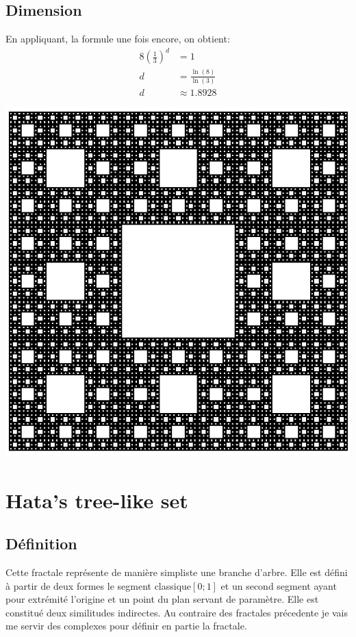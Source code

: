 \documentclass[a4paper, 12pt]{report}
\begin{document}
			\subsection{Dimension}
				En appliquant, la formule une fois encore, on obtient:
				\begin{align*}
					 8\left(\frac{1}{3}\right)^d	&=1\\
												d	&=\frac{\ln(8)}{\ln(3)}\\
												d	&\approx 1.8928
				\end{align*}
				\begin{center}
					\includegraphics[scale=0.3]{Images/carpet}
				\end{center}
		\newpage
		\section{Hata's tree-like set}
			\subsection{Définition}
			Cette fractale représente de manière simpliste une branche d'arbre. Elle est défini à partir de deux formes le segment classique$[0;1]$ et un second segment ayant pour extrémité l'origine et un point du plan servant de paramètre. Elle est constitué deux similitudes indirectes. Au contraire des fractales précedente je vais me servir des complexes pour définir en partie la fractale.
			
\end{document}

